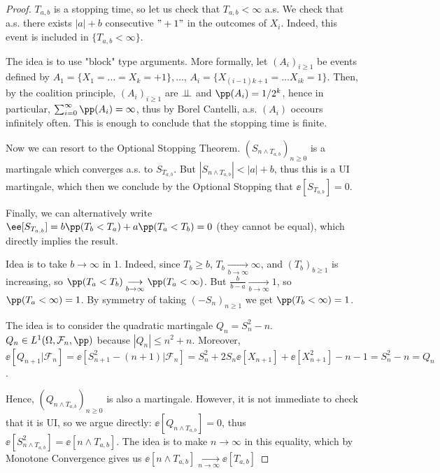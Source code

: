 \documentclass[../main.tex]{subfiles}
\begin{document}
  \begin{proof}
    \hfill
    
      $T_{a,b}$ is a stopping time, so let us check that $T_{a, b} < \infty$
     a.s. We check that a.s. there exists $|a| + b$ consecutive $"+1"$ in the
     outcomes of $X_i$. Indeed, this event is included in $\{ T_{a, b}< \infty
     \} $.

     The idea is to use "block" type arguments. More formally, let $(A_i)_{i
     \geq 1}$ be events defined by $A_{1} = \{ X_1 = \ldots = X_k = +1 \}, \ldots $, 
     $A_{i} = \{ X_{(i-1)k + 1} = \ldots X_{ik} = 1 \} $.
     Then, by the coalition principle, $(A_i)_{i \geq 1}$ are $\perp\!\!\!\!\,\perp$ and
     $\pp(A_i) = 1/2^k$, hence in particular, $\sum_{i=0}^\infty\pp(A_i) =
     \infty$, thus by Borel Cantelli, a.s. $(A_i)$ occours infinitely often.
     This is enough to conclude that the stopping time is finite.

     Now we can resort to the Optional Stopping Theorem. $(S_{n \wedge T_{a,
     b}})_{n \geq 0}$ is a martingale which converges a.s. to $S_{T_{a, b}}$.
     But $|S_{n \wedge T_{a, b}}| < |a| + b$, thus this is a UI martingale,
     which then we conclude by the Optional Stopping that $\ee[S_{T_{a, b}}] = 0$.

     Finally, we can alternatively write $\ee[S_{T_{a, b}}] = b \pp(T_b < T_a) +
     a \pp(T_a < T_b) = 0$ (they cannot be equal), which directly implies the result.

     \vspace{0.8em}

     Idea is to take $b \to \infty$ in 1. Indeed, since $T_b \geq b$, $T_b
     \underset{b \to \infty}{\longrightarrow} \infty$, and $(T_b)_{b \geq 1}$ is
     increasing, so $\pp(T_a < T_b) \underset{b \to \infty}{\longrightarrow}
     \pp(T_a < \infty)$. But $\frac{b}{b - a} \underset{b \to
     \infty}{\longrightarrow}1$, so $\pp(T_a < \infty) = 1$. By symmetry of
     taking $(-S_n)_{n \geq 1}$ we get $\pp(T_b < \infty) = 1$.

     \vspace{0.8em}

      The idea is to consider the quadratic martingale $Q_n = S_n^{2}
     - n$. $Q_n \in L^1 (\Omega, \mathcal{F}_n, \pp)$ because $|Q_n| \leq n^2 +
     n$. Moreover, $\ee[Q_{n+1} | \mathcal{F}_n] = \ee[S_{n+1}^2 - (n+1) |
     \mathcal{F}_n] = S_n^2 + 2S_n \ee[X_{n+1}] + \ee[X_{n+1}^2] - n - 1 = S_n^2
     - n = Q_n$.

     Hence, $(Q_{n \wedge T_{a, b}})_{n \geq 0}$ is also a martingale. However,
     it is not immediate to check that it is UI, so we argue directly: $\ee[Q_{n
     \wedge T_{a, b}}] = 0$, thus $\ee[S^2_{n \wedge T_{a, b}}] = \ee[n \wedge
     T_{a, b}]$. The idea is to make $n \to \infty$ in this equality, which by
     Monotone Convergence gives us $\ee[n \wedge T_{a,b}] \underset{n \to
     \infty}{\longrightarrow} \ee[T_{a, b}]$


\end{proof}
\end{document}
